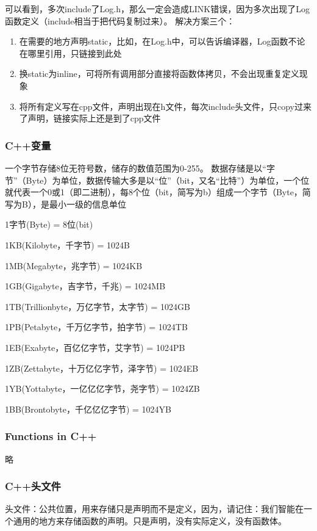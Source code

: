 可以看到，多次{\ncodestyle include}了{\ncodestyle Log.h}，那么一定会造成{\ncodestyle LINK}错误，因为多次出现了{\ncodestyle Log}函数定义（{\ncodestyle include}相当于把代码复制过来）。
解决方案三个：

\begin{enumerate}
	\item 在需要的地方声明{\ncodestyle static}，比如，在{\ncodestyle Log.h}中，可以告诉编译器，{\ncodestyle Log}函数不论在哪里引用，只链接到此处
	\item 换{\ncodestyle static}为{\ncodestyle inline}，可将所有调用部分直接将函数体拷贝，不会出现重复定义现象
	\item 将所有定义写在{\ncodestyle cpp}文件，声明出现在{\ncodestyle h}文件，每次{\ncodestyle include}头文件，只{\ncodestyle copy}过来了声明，链接实际上还是到了{\ncodestyle cpp}文件
\end{enumerate}



\subsubsection{C++变量}


一个字节存储8位无符号数，储存的数值范围为0-255。
数据存储是以“字节”（Byte）为单位，数据传输大多是以“位”（bit，又名“比特”）为单位，一个位就代表一个0或1（即二进制），每8个位（bit，简写为b）组成一个字节（Byte，简写为B），是最小一级的信息单位

1字节(Byte) = 8位(bit)

1KB(Kilobyte，千字节) = 1024B

1MB(Megabyte，兆字节) = 1024KB

1GB(Gigabyte，吉字节，千兆) = 1024MB

1TB(Trillionbyte，万亿字节，太字节) = 1024GB

1PB(Petabyte，千万亿字节，拍字节) = 1024TB

1EB(Exabyte，百亿亿字节，艾字节) = 1024PB

1ZB(Zettabyte，十万亿亿字节，泽字节) = 1024EB

1YB(Yottabyte，一亿亿亿字节，尧字节) = 1024ZB

1BB(Brontobyte，千亿亿亿字节) = 1024YB


\subsubsection{Functions in C++}
略

\subsubsection{C++头文件}
头文件：公共位置，用来存储只是声明而不是定义，因为，请记住：我们智能在一个通用的地方来存储函数的声明。只是声明，没有实际定义，没有函数体。

